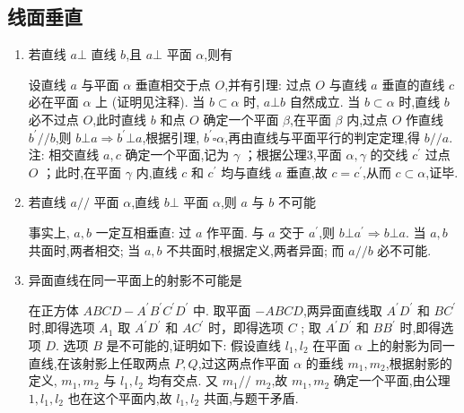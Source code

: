 \subsection*{线面垂直}
\begin{enumerate}
    \item 若直线 $a \bot$ 直线 $b$,且 $a \bot$ 平面 $\alpha$,则有
    \begin{jieda}
        设直线 $a$ 与平面 $\alpha$ 垂直相交于点 $O$,并有引理: 过点 $O$ 与直线 $a$ 垂直的直线 $c$ 必在平面 $\alpha$ 上 (证明见注释). 当 $b \subset  \alpha$ 时, $a \bot  b$ 自然成立. 当 $b \subset  \alpha$ 时,直线 $b$ 必不过点 $O$,此时直线 $b$ 和点 $O$ 确定一个平面 $\beta$,在平面 $\beta$ 内,过点 $O$ 作直线 ${b}^{\prime }//b$,则 $b\bot a \Longrightarrow  {b}^{\prime }\bot a$,根据引理, ${b}^{\prime }\square \alpha$,再由直线与平面平行的判定定理,得 $b//a$. 注: 相交直线 $a,c$ 确定一个平面,记为 $\gamma$ ；根据公理3,平面 $\alpha,\gamma$ 的交线 ${c}^{\prime }$ 过点 $O$ ；此时,在平面 $\gamma$ 内,直线 $c$ 和 ${c}^{\prime }$ 均与直线 $a$ 垂直,故 $c = {c}^{\prime }$,从而 $c \subset  \alpha$,证毕.
    \end{jieda}
    \item 若直线 $a//$ 平面 $\alpha$,直线 $b\bot$ 平面 $\alpha$,则 $a$ 与 $b$ 不可能
    \begin{jieda}
        事实上, $a,b$ 一定互相垂直: 过 $a$ 作平面. 与 $a$ 交于 ${a}^{\prime }$,则 $b\bot {a}^{\prime } \Longrightarrow  b\bot a$. 当 $a,b$ 共面时,两者相交; 当 $a,b$ 不共面时,根据定义,两者异面; 而 $a//b$ 必不可能.
    \end{jieda}
    
    \item 异面直线在同一平面上的射影不可能是
    \begin{jieda}
        在正方体 ${ABCD} - {A}^{\prime }{B}^{\prime }{C}^{\prime }{D}^{\prime }$ 中. 取平面 $- {ABCD}$,两异面直线取 ${A}^{\prime }{D}^{\prime }$ 和 $B{C}^{\prime }$ 时,即得选项 ${A}_{1}$ 取 ${A}^{\prime }{D}^{\prime }$ 和 $A{C}^{\prime }$ 时，即得选项 $C$ ; 取 ${A}^{\prime }{D}^{\prime }$ 和 $B{B}^{\prime }$ 时,即得选项 $D$. 选项 $B$ 是不可能的,证明如下: 假设直线 ${l}_{1},{l}_{2}$ 在平面 $\alpha$ 上的射影为同一直线,在该射影上任取两点 $P,Q$,过这两点作平面 $\alpha$ 的垂线 ${m}_{1},{m}_{2}$,根据射影的定义, ${m}_{1},{m}_{2}$ 与 ${l}_{1},{l}_{2}$ 均有交点. 又 ${m}_{1}//$  ${m}_{2}$,故 ${m}_{1},{m}_{2}$ 确定一个平面,由公理 $1,{l}_{1},{l}_{2}$ 也在这个平面内,故 ${l}_{1},{l}_{2}$ 共面,与题干矛盾.
    \end{jieda}
    

\end{enumerate}
